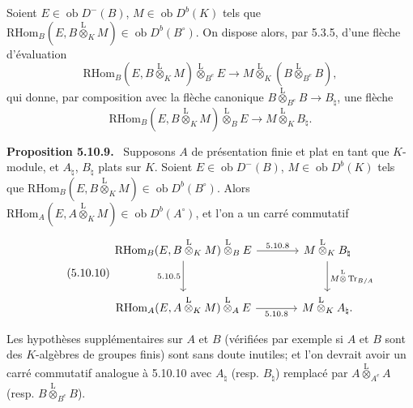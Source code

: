 \documentclass[11pt]{article}
\newenvironment{statement}[1]{\par\medskip\noindent\textbf{#1.}\ }{\par\medskip}
\newcommand{\ob}{\operatorname{ob}}
\providecommand{\RHom}{\mathrm{RHom}}
\providecommand{\Tr}{\operatorname{Tr}}
\providecommand{\Tr}{\operatorname{Tr}}
\providecommand{\lten}{\overset{\mathrm L}{\otimes}}
\providecommand{\Tr}{\operatorname{Tr}}
\providecommand{\RHom}{\mathrm{RHom}}
\providecommand{\ob}{\operatorname{ob}}
\providecommand{\lten}{\overset{\mathrm L}{\otimes}}
\providecommand{\RHom}{\mathrm R\mathcal{H}om}
\providecommand{\lten}{\overset{\mathrm L}{\otimes}}
\providecommand{\Tr}{\operatorname{Tr}}
\providecommand{\lten}{\overset{\mathrm L}{\otimes}}
\providecommand{\lten}{\overset{\mathrm L}{\otimes}}
\providecommand{\lten}{\overset{\mathrm L}{\otimes}}
\providecommand{\RHom}{\mathrm{RHom}}
\providecommand{\Tr}{\operatorname{Tr}}
\providecommand{\lten}{\overset{\mathrm L}{\otimes}}
\begin{document}
Soient $E\in\ob D^-(B)$, $M\in\ob D^b(K)$ tels que $\RHom_B(E,B\lten_KM)\in\ob D^b(B^\circ)$. On dispose alors, par 5.3.5, d'une flèche d'évaluation
\[
\RHom_B(E,B\lten_KM)\lten_{B^e}E\longrightarrow M\lten_K(B\lten_{B^e}B),
\]
qui donne, par composition avec la flèche canonique $B\lten_{B^e}B\to B_\natural$, une flèche
\begin{equation}\tag{5.10.8}
\RHom_B(E,B\lten_KM)\lten_BE\longrightarrow M\lten_KB_\natural.
\end{equation}

\begin{statement}{Proposition 5.10.9}
Supposons $A$ de présentation finie et plat en tant que $K$-module, et $A_\natural$, $B_\natural$ plats sur $K$. Soient $E\in\ob D^-(B)$, $M\in\ob D^b(K)$ tels que $\RHom_B(E,B\lten_KM)\in\ob D^b(B^\circ)$. Alors $\RHom_A(E,A\lten_KM)\in\ob D^b(A^\circ)$, et l'on a un carré commutatif
\begin{equation}\tag{5.10.10}
\begin{tikzcd}[column sep=large,row sep=large]
\RHom_B(E,B\lten_KM)\lten_BE \arrow[r,"5.10.8"] \arrow[d,"5.10.5"'] & M\lten_KB_\natural \arrow[d,"M\lten\Tr_{B/A}"]\\
\RHom_A(E,A\lten_KM)\lten_AE \arrow[r,"5.10.8"'] & M\lten_KA_\natural .
\end{tikzcd}
\end{equation}
\end{statement}

Les hypothèses supplémentaires sur $A$ et $B$ (vérifiées par exemple si $A$ et $B$ sont des $K$-algèbres de groupes finis) sont sans doute inutiles; et l'on devrait avoir un carré commutatif analogue à 5.10.10 avec $A_\natural$ (resp. $B_\natural$) remplacé par $A\lten_{A^e}A$ (resp. $B\lten_{B^e}B$).
\end{document}
